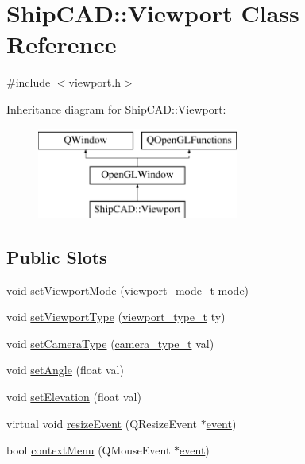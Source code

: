 \hypertarget{classShipCAD_1_1Viewport}{\section{Ship\-C\-A\-D\-:\-:Viewport Class Reference}
\label{classShipCAD_1_1Viewport}
}


{\ttfamily \#include $<$viewport.\-h$>$}

Inheritance diagram for Ship\-C\-A\-D\-:\-:Viewport\-:\begin{figure}[H]
\begin{center}
\leavevmode
\includegraphics[height=3.000000cm]{classShipCAD_1_1Viewport}
\end{center}
\end{figure}
\subsection*{Public Slots}
\begin{DoxyCompactItemize}
\item 
void \hyperlink{classShipCAD_1_1Viewport_a578ac5ee96e36638739517fa21bf70c0}{set\-Viewport\-Mode} (\hyperlink{namespaceShipCAD_a67437198ee14f74e6c5277d761894863}{viewport\-\_\-mode\-\_\-t} mode)
\item 
void \hyperlink{classShipCAD_1_1Viewport_a554a3455c39ee5652b13c9b24c3c962e}{set\-Viewport\-Type} (\hyperlink{namespaceShipCAD_aeeeb05810f2e31ef89fd4ac6b6ba9c0a}{viewport\-\_\-type\-\_\-t} ty)
\item 
void \hyperlink{classShipCAD_1_1Viewport_a5f90a885e0204b32ff9795c4b79f824b}{set\-Camera\-Type} (\hyperlink{namespaceShipCAD_a58f51ebd2e66de5e41c2ffd6f434241e}{camera\-\_\-type\-\_\-t} val)
\item 
void \hyperlink{classShipCAD_1_1Viewport_a00ba2139fa06701b65de70d5c657f5d6}{set\-Angle} (float val)
\item 
void \hyperlink{classShipCAD_1_1Viewport_a4bda4b742dc477ed5dc2ab6ac7fe92bc}{set\-Elevation} (float val)
\item 
virtual void \hyperlink{classShipCAD_1_1Viewport_a4eeeb100fd88487215bb7794bdf5e0cb}{resize\-Event} (Q\-Resize\-Event $\ast$\hyperlink{classOpenGLWindow_a1e3045cffb900de55b7384f5091c9d94}{event})
\item 
bool \hyperlink{classShipCAD_1_1Viewport_ab247f28eb569e160142901b6eef265a3}{context\-Menu} (Q\-Mouse\-Event $\ast$\hyperlink{classOpenGLWindow_a1e3045cffb900de55b7384f5091c9d94}{event})
\end{DoxyCompactItemize}
